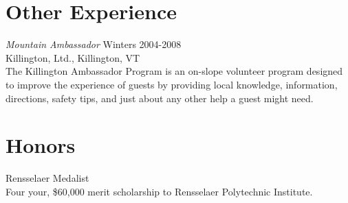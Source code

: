 \documentclass{article}
\begin{document}
  \section*{Other Experience}             
  {\it Mountain Ambassador} \hfill Winters 2004-2008\\
  Killington, Ltd., Killington, VT \\
  The Killington Ambassador Program is an on-slope volunteer program designed to improve the experience of guests by providing local knowledge, information, directions, safety tips, and just about any other help a guest might need.

  \section*{Honors}
  Rensselaer Medalist\\
  Four your, \$60,000 merit scholarship to Rensselaer Polytechnic Institute.
  
\end{document}

